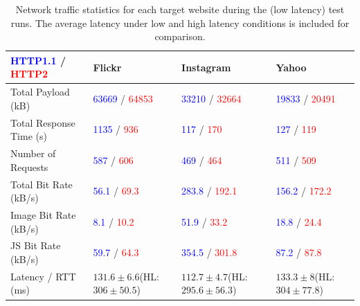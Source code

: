 \documentclass{article}
\begin{document}
\begin{table}[h!]
    \caption{Network traffic statistics for each target website during the (low latency) test runs. The average latency under low and high latency conditions is included for comparison.}
    \label{table:network-stats}
    \begin{tabular}{|l|K{2.6cm}|K{2.8cm}|K{2.5cm}|}
        \hline
        \textcolor{blue}{HTTP1.1} / \textcolor{red}{HTTP2} & \textbf{Flickr} & \textbf{Instagram} & \textbf{Yahoo} \\ \hline
        Total Payload (kB) & \textcolor{blue}{63669} / \textcolor{red}{64853}  & \textcolor{blue}{33210} / \textcolor{red}{32664}  &
        \textcolor{blue}{19833} / \textcolor{red}{20491}  \\ \hline
        Total Response Time (s) & \textcolor{blue}{1135} / \textcolor{red}{936}  &\textcolor{blue}{117} / \textcolor{red}{170}  &
        \textcolor{blue}{127} / \textcolor{red}{119}  \\ \hline

        Number of Requests & \textcolor{blue}{587} / \textcolor{red}{606} & \textcolor{blue}{469} / \textcolor{red}{464} & \textcolor{blue}{511} / \textcolor{red}{509} \\ \hline

        Total Bit Rate (kB/s) & \textcolor{blue}{56.1} / \textcolor{red}{69.3} & \textcolor{blue}{283.8} / \textcolor{red}{192.1} & \textcolor{blue}{156.2} / \textcolor{red}{172.2} \\  \hline

        Image Bit Rate (kB/s) & \textcolor{blue}{8.1} / \textcolor{red}{10.2} &\textcolor{blue}{51.9} / \textcolor{red}{33.2}  & \textcolor{blue}{18.8} / \textcolor{red}{24.4}  \\ \hline

        JS Bit Rate (kB/s) & \textcolor{blue}{59.7} / \textcolor{red}{64.3} &\textcolor{blue}{354.5} / \textcolor{red}{301.8}  & \textcolor{blue}{87.2} / \textcolor{red}{87.8}  \\ \hline

        Latency / RTT (ms) & $131.6\pm6.6$\newline(HL: $306\pm50.5$)    & $112.7\pm4.7$\newline(HL: $295.6\pm56.3$) & $133.3\pm8$\newline(HL: $304\pm77.8$) \\ \hline
    \end{tabular}
\end{table}
\end{document}
